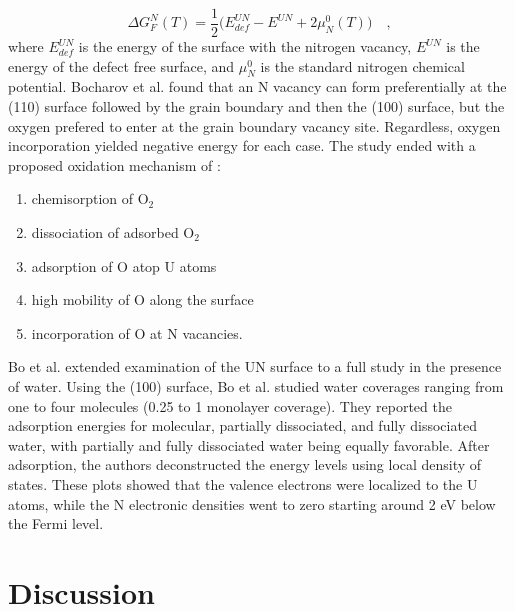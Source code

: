 \documentclass[3p,review,11pt]{elsarticle}
\begin{document}
\begin{equation}
\Delta G^{N}_{F}(T) = \frac{1}{2} \bigg(E^{UN}_{def}-E^{UN}+2\mu _{N}^{0}(T)\bigg) \quad ,
\end{equation} 
where $E^{UN}_{def}$ is the energy of the surface with the nitrogen vacancy, $E^{UN}$ is the energy of the defect free surface, and $\mu _{N}^{0}$ is the standard nitrogen chemical potential. Bocharov et al. found that an N vacancy can form preferentially at the (110) surface followed by the grain boundary and then the (100) surface, but the oxygen prefered to enter at the grain boundary vacancy site. Regardless, oxygen incorporation yielded negative energy for each case. The study ended with a proposed oxidation mechanism of \cite{Bocharov2013}: 
\begin{enumerate}
	\item chemisorption of O$_{2}$
	\item dissociation of adsorbed O$_{2}$
	\item adsorption of O atop U atoms
	\item high mobility of O along the surface
	\item incorporation of O at N vacancies.
\end{enumerate}
\par 
Bo et al. \cite{Bo2016} extended examination of the UN surface to a full study in the presence of water. Using the (100) surface, Bo et al. studied water coverages ranging from one to four molecules (0.25 to 1 monolayer coverage). They reported the adsorption energies for molecular, partially dissociated, and fully dissociated water, with partially and fully dissociated water being equally favorable. After adsorption, the authors deconstructed the energy levels using local density of states. These plots showed that the valence electrons were localized to the U atoms, while the N electronic densities went to zero starting around 2 eV below the Fermi level.

\section{Discussion}
\end{document}
